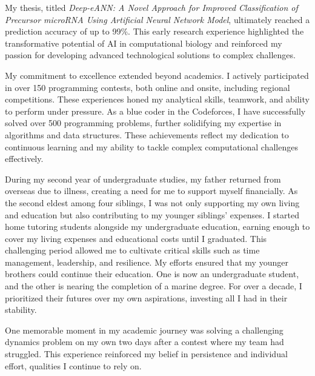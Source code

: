 \documentclass[11pt]{article}
\newif\ifshowsections
\begin{document}
My thesis, titled \textit{Deep-eANN: A Novel Approach for Improved Classification of Precursor microRNA Using
Artificial Neural Network Model}, ultimately reached a prediction accuracy of up to 99\%. This early research
experience highlighted the transformative potential of AI in computational biology and reinforced my passion for
developing advanced technological solutions to complex challenges.

\ifshowsections\section*{Programming Contest Experience}\fi

My commitment to excellence extended beyond academics. I actively participated in over 150 programming
contests, both online and onsite, including regional competitions. These experiences honed my analytical
skills, teamwork, and ability to perform under pressure. As a blue coder in the Codeforces, I have successfully
solved over 500 programming problems, further solidifying my expertise in algorithms and data structures.
These achievements reflect my dedication to continuous learning and my ability to tackle complex computational
challenges effectively.

\ifshowsections\section*{Personal Resilience and Sacrifices}\fi

During my second year of undergraduate studies, my father returned from overseas due to illness,
creating a need for me to support myself financially. As the second eldest among four siblings, I was
not only supporting my own living and education but also contributing to my younger siblings' expenses.
I started home tutoring students alongside my undergraduate education, earning enough to cover my
living expenses and educational costs until I graduated. This challenging period allowed me to cultivate
critical skills such as time management, leadership, and resilience. My efforts ensured that my younger
brothers could continue their education. One is now an undergraduate student, and the other is nearing the
completion of a marine degree. For over a decade, I prioritized their futures over my own aspirations,
investing all I had in their stability.

One memorable moment in my academic journey was solving a challenging dynamics problem on my own two days
after a contest where my team had struggled. This experience reinforced my belief in persistence and
individual effort, qualities I continue to rely on.
\end{document}
